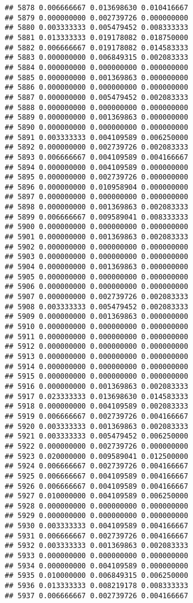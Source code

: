 \documentclass[
]{article}
\begin{document}
\begin{verbatim}
## 5878 0.006666667 0.013698630 0.010416667
## 5879 0.000000000 0.002739726 0.000000000
## 5880 0.003333333 0.005479452 0.008333333
## 5881 0.013333333 0.019178082 0.018750000
## 5882 0.006666667 0.019178082 0.014583333
## 5883 0.000000000 0.006849315 0.002083333
## 5884 0.000000000 0.000000000 0.000000000
## 5885 0.000000000 0.001369863 0.000000000
## 5886 0.000000000 0.000000000 0.000000000
## 5887 0.000000000 0.005479452 0.002083333
## 5888 0.000000000 0.000000000 0.000000000
## 5889 0.000000000 0.001369863 0.000000000
## 5890 0.000000000 0.000000000 0.000000000
## 5891 0.003333333 0.004109589 0.006250000
## 5892 0.000000000 0.002739726 0.002083333
## 5893 0.006666667 0.004109589 0.004166667
## 5894 0.000000000 0.004109589 0.000000000
## 5895 0.000000000 0.002739726 0.000000000
## 5896 0.000000000 0.010958904 0.000000000
## 5897 0.000000000 0.000000000 0.000000000
## 5898 0.000000000 0.001369863 0.002083333
## 5899 0.006666667 0.009589041 0.008333333
## 5900 0.000000000 0.000000000 0.000000000
## 5901 0.000000000 0.001369863 0.002083333
## 5902 0.000000000 0.000000000 0.000000000
## 5903 0.000000000 0.000000000 0.000000000
## 5904 0.000000000 0.001369863 0.000000000
## 5905 0.000000000 0.000000000 0.000000000
## 5906 0.000000000 0.000000000 0.000000000
## 5907 0.000000000 0.002739726 0.002083333
## 5908 0.003333333 0.005479452 0.002083333
## 5909 0.000000000 0.001369863 0.000000000
## 5910 0.000000000 0.000000000 0.000000000
## 5911 0.000000000 0.000000000 0.000000000
## 5912 0.000000000 0.000000000 0.000000000
## 5913 0.000000000 0.000000000 0.000000000
## 5914 0.000000000 0.000000000 0.000000000
## 5915 0.000000000 0.000000000 0.000000000
## 5916 0.000000000 0.001369863 0.002083333
## 5917 0.023333333 0.013698630 0.014583333
## 5918 0.000000000 0.004109589 0.002083333
## 5919 0.006666667 0.002739726 0.004166667
## 5920 0.003333333 0.001369863 0.002083333
## 5921 0.003333333 0.005479452 0.006250000
## 5922 0.000000000 0.002739726 0.000000000
## 5923 0.020000000 0.009589041 0.012500000
## 5924 0.006666667 0.002739726 0.004166667
## 5925 0.006666667 0.004109589 0.004166667
## 5926 0.006666667 0.004109589 0.004166667
## 5927 0.010000000 0.004109589 0.006250000
## 5928 0.000000000 0.000000000 0.000000000
## 5929 0.000000000 0.000000000 0.000000000
## 5930 0.003333333 0.004109589 0.004166667
## 5931 0.006666667 0.002739726 0.004166667
## 5932 0.003333333 0.001369863 0.002083333
## 5933 0.000000000 0.000000000 0.000000000
## 5934 0.000000000 0.004109589 0.000000000
## 5935 0.010000000 0.006849315 0.006250000
## 5936 0.013333333 0.008219178 0.008333333
## 5937 0.006666667 0.002739726 0.004166667

\end{verbatim}
\end{document}

